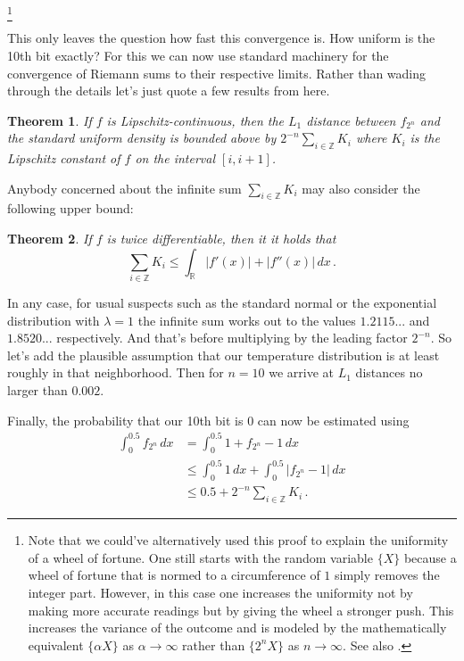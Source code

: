 \documentclass{article}
\theoremstyle{theorem}
\newtheorem{theorem}{Theorem}
\theoremstyle{definition}
\begin{document}
\let\thefootnote\relax\footnote{Note that we could've alternatively used this proof to explain the uniformity of a wheel of fortune. One still starts with the random variable $\{X\}$ because a wheel of fortune that is normed to a circumference of $1$ simply removes the integer part. However, in this case one increases the uniformity not by making more accurate readings but by giving the wheel a stronger push. This increases the variance of the outcome and is modeled by the mathematically equivalent $\{\alpha X\}$ as $\alpha\to\infty$ rather than $\{2^n X\}$ as $n\to\infty$. See also \cite{zaman}.}
\addtocounter{footnote}{-1}\let\thefootnote\svthefootnote
This only leaves the question how fast this convergence is. How uniform is the 10th bit exactly? For this we can now use standard machinery for the convergence of Riemann sums to their respective limits. Rather than wading through the details let's just quote a few results from \cite{oberhoff} here.

\begin{theorem}
If $f$ is Lipschitz-continuous, then the $L_1$ distance between $f_{2^n}$ and the standard uniform density is bounded above by $2^{-n}\sum_{i\in\mathbb{Z}}K_i$ where $K_i$ is the Lipschitz constant of $f$ on the interval $[i,i+1]$.
\end{theorem}

Anybody concerned about the infinite sum $\sum_{i\in\mathbb{Z}}K_i$ may also consider the following upper bound:

\begin{theorem}
If $f$ is twice differentiable, then it it holds that
\[
\sum_{i\in\mathbb{Z}}K_i \leq \int_\mathbb{R} |f'(x)|+|f''(x)|\,dx\,.
\]
\end{theorem}

In any case, for usual suspects such as the standard normal or the exponential distribution with $\lambda=1$ the infinite sum works out to the values $1.2115...$ and $1.8520...$ respectively. And that's before multiplying by the leading factor $2^{-n}$. So let's add the plausible assumption that our temperature distribution is at least roughly in that neighborhood. Then for $n=10$ we arrive at $L_1$ distances no larger than $0.002$.

Finally, the probability that our 10th bit is $0$ can now be estimated using
\[
\begin{split}
\int_0^{0.5} f_{2^n}\,dx
& = \int_0^{0.5} 1 + f_{2^n} - 1\,dx\\
& \leq \int_0^{0.5}1\,dx + \int_0^{0.5} |f_{2^n}-1|\,dx\\
& \leq 0.5+2^{-n}\sum_{i\in\mathbb{Z}}K_i\,.
\end{split}
\]
\end{document}

